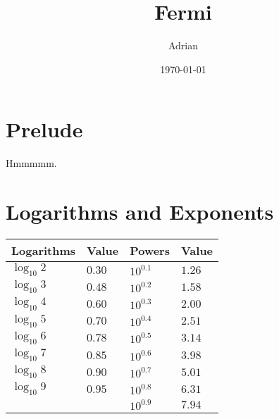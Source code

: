 \documentclass{article}
\newcommand\logten{\ensuremath{\log_{10}}}
\begin{document}
\title{Fermi}
\date{\today}
\author{Adrian}
\maketitle

\tableofcontents

\section{Prelude}
Hmmmmm.

\clearpage

\section{Logarithms and Exponents}
\begin{table}[H]
	\centering
	\begin{tabularx}{0.75\textwidth}{X X || X X}
		Logarithms & Value & Powers & Value\\
		\hline
		$\logten 2$ & $0.30$ & $10^{0.1}$ & $1.26$ \\
		$\logten 3$ & $0.48$ & $10^{0.2}$ & $1.58$ \\
		$\logten 4$ & $0.60$ & $10^{0.3}$ & $2.00$ \\
		$\logten 5$ & $0.70$ & $10^{0.4}$ & $2.51$ \\
		$\logten 6$ & $0.78$ & $10^{0.5}$ & $3.14$ \\
		$\logten 7$ & $0.85$ & $10^{0.6}$ & $3.98$ \\
		$\logten 8$ & $0.90$ & $10^{0.7}$ & $5.01$ \\
		$\logten 9$ & $0.95$ & $10^{0.8}$ & $6.31$ \\
		            &        & $10^{0.9}$ & $7.94$ \\
	\end{tabularx}
\end{table}
\end{document}
